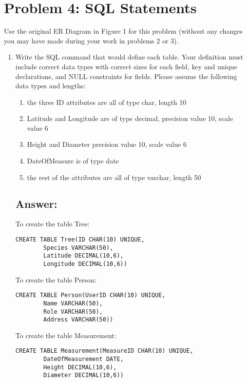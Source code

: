 \documentclass[letter,11pt]{article}
\begin{document}
\section*{Problem 4: SQL Statements}

Use the original ER Diagram in Figure 1 for this problem (without any changes you may have made during your work in problems 2 or 3).

\begin{enumerate}
\item Write the SQL command that would define each table. Your definition must include correct data types with correct sizes for each field, key and unique declarations, and NULL constraints for fields. Please assume the following data types and lengths: 
  \begin{enumerate}
  \item the three ID attributes are all of type char, length 10
  \item Latitude and Longitude are of type decimal, precision value 10, scale value 6
  \item Height and Diameter precision value 10, scale value 6
  \item DateOfMeasure is of type date
  \item the rest of the attributes are all of type varchar, length 50
  \end{enumerate}
\subsection*{Answer:}
To create the table Tree:\\
\begin{lstlisting}[frame=single]
CREATE TABLE Tree(ID CHAR(10) UNIQUE,
        Species VARCHAR(50),
        Latitude DECIMAL(10,6),
        Longitude DECIMAL(10,6))
\end{lstlisting}

To create the table Person:\\
\begin{lstlisting}[frame=single]
CREATE TABLE Person(UserID CHAR(10) UNIQUE,
        Name VARCHAR(50),
        Role VARCHAR(50),
        Address VARCHAR(50))
\end{lstlisting}

To create the table Measurement:\\
\begin{lstlisting}[frame=single]
CREATE TABLE Measurement(MeasureID CHAR(10) UNIQUE,
        DateOfMeasurement DATE,
        Height DECIMAL(10,6),
        Diameter DECIMAL(10,6))
\end{lstlisting}


\end{enumerate}
\end{document}
